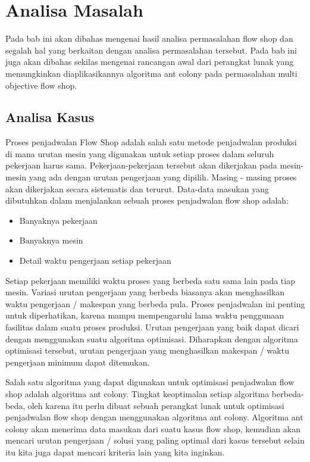 \chapter{Analisa Masalah}
\label{chap:analisa}

	Pada bab ini akan dibahas mengenai hasil analisa permasalahan flow shop dan segalah hal yang berkaitan dengan analisa permasalahan tersebut.
	Pada bab ini juga akan dibahas sekilas mengenai rancangan awal dari perangkat lunak yang memungkinkan diaplikasikannya
	algoritma ant colony pada permasalahan multi objective flow shop.
	
	
\section{Analisa Kasus}

	Proses penjadwalan Flow Shop adalah salah satu metode penjadwalan produksi di mana urutan mesin 
	yang digunakan untuk setiap proses dalam seluruh pekerjaan harus sama. Pekerjaan-pekerjaan tersebut
	akan dikerjakan pada mesin-mesin yang ada dengan urutan pengerjaan yang dipilih. Masing - masing
	proses akan dikerjakan secara sistematis dan terurut. Data-data masukan yang dibutuhkan
	dalam menjalankan sebuah proses penjadwalan flow shop adalah:
	\begin{itemize}
		\item Banyaknya pekerjaan
		\item Banyaknya mesin
		\item Detail waktu pengerjaan setiap pekerjaan
		
	\end{itemize}

	Setiap pekerjaan memiliki waktu proses yang berbeda satu sama lain pada tiap mesin. Variasi
	urutan pengerjaan yang berbeda biasanya akan menghasilkan waktu pengerjaan / makespan yang
	berbeda pula. Proses penjadwalan ini penting untuk diperhatikan, karena mampu mempengaruhi
	lama waktu penggunaan fasilitas dalam suatu proses produksi. Urutan pengerjaan yang baik dapat
	dicari dengan menggunakan suatu algoritma optimisasi. Diharapkan dengan algoritma optimisasi
	tersebut, urutan pengerjaan yang menghasilkan makespan / waktu pengerjaan minimum dapat
	ditemukan.
	
	Salah satu algoritma yang dapat digunakan untuk optimisasi penjadwalan flow shop
	adalah algoritma ant colony. Tingkat keoptimalan setiap algoritma berbeda-beda, oleh karena
	itu perlu dibuat sebuah perangkat lunak untuk optimisasi penjadwalan flow shop dengan
	menggunakan algoritma ant colony. Algoritma ant colony akan menerima data masukan dari suatu
	kasus flow shop, kemudian akan mencari urutan pengerjaan / solusi yang paling optimal dari
	kasus tersebut selain itu kita juga dapat mencari kriteria lain yang kita inginkan.
	
